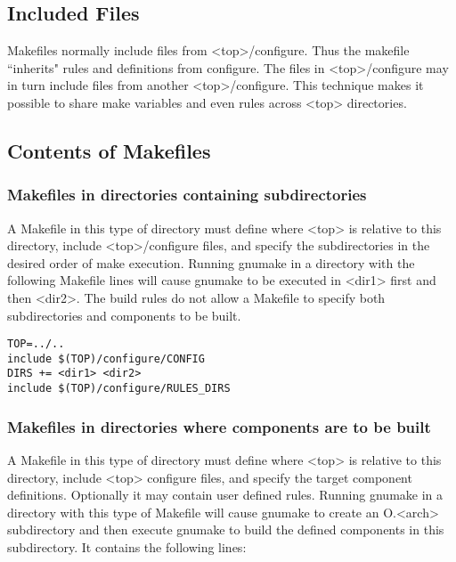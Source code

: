 \subsection{Included Files}

Makefiles normally include files from \textless{}top\textgreater{}/configure. Thus the makefile ``inherits" rules and definitions from configure. 
The files in \textless{}top\textgreater{}/configure may in turn include files from another \textless{}top\textgreater{}/configure. This technique makes it possible to 
share make variables and even rules across \textless{}top\textgreater{} directories.

\subsection{Contents of Makefiles}

\subsubsection{Makefiles in directories containing subdirectories}

A Makefile in this type of directory must define where \textless{}top\textgreater{} is relative to this directory, include \textless{}top\textgreater{}/configure files, 
and specify the subdirectories in the desired order of make execution. Running gnumake in a directory with the following 
Makefile lines will cause gnumake to be executed in \textless{}dir1\textgreater{} first and then \textless{}dir2\textgreater{}. The build rules do not allow a Makefile 
to specify both subdirectories and components to be built.

\begin{verbatim}TOP=../..
include $(TOP)/configure/CONFIG
DIRS += <dir1> <dir2>
include $(TOP)/configure/RULES_DIRS

\end{verbatim}\subsubsection{Makefiles in directories where components are to be built}

A Makefile in this type of directory must define where \textless{}top\textgreater{} is relative to this directory, include \textless{}top\textgreater{} configure files, 
and specify the target component definitions. Optionally it may contain user defined rules. Running gnumake in a 
directory with this type of Makefile will cause gnumake to create an O.\textless{}arch\textgreater{} subdirectory and then execute gnumake to 
build the defined components in this subdirectory. It contains the following lines:

